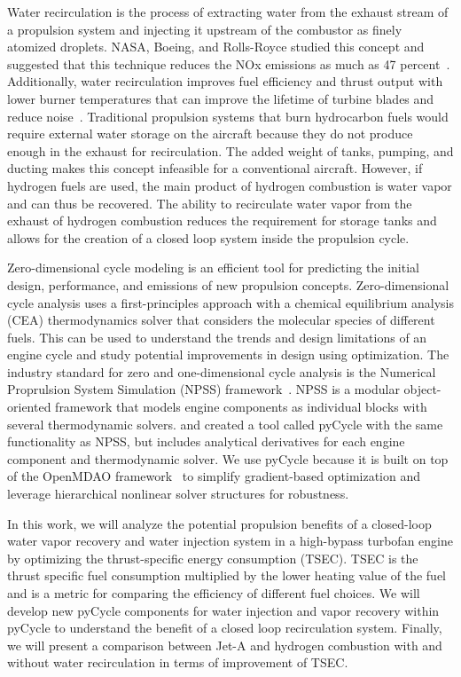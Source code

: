 \documentclass[conf]{new-aiaa}
\begin{document}
Water recirculation is the process of extracting water from the exhaust stream of a propulsion system and injecting it upstream of the combustor as finely atomized droplets.
NASA, Boeing, and Rolls-Royce studied this concept and suggested that this technique reduces the NOx emissions as much as 47 percent~\cite{nasa_inject}.
Additionally, water recirculation improves fuel efficiency and thrust output with lower burner temperatures that can improve the lifetime of turbine blades and reduce noise~\cite{nasa_inject}.
Traditional propulsion systems that burn hydrocarbon fuels would require external water storage on the aircraft because they do not produce enough in the exhaust for recirculation.
The added weight of tanks, pumping, and ducting makes this concept infeasible for a conventional aircraft.
However, if hydrogen fuels are used, the main product of hydrogen combustion is water vapor and can thus be recovered.
The ability to recirculate water vapor from the exhaust of hydrogen combustion reduces the requirement for storage tanks and allows for the creation of a closed loop system inside the propulsion cycle.

Zero-dimensional cycle modeling is an efficient tool for predicting the initial design, performance, and emissions of new propulsion concepts.
Zero-dimensional cycle analysis uses a first-principles approach with a chemical equilibrium analysis (CEA) thermodynamics solver that considers the molecular species of different fuels.
This can be used to understand the trends and design limitations of an engine cycle and study potential improvements in design using optimization.
The industry standard for zero and one-dimensional cycle analysis is the Numerical Proprulsion System Simulation (NPSS) framework~\cite{JonesNPSS}.
NPSS is a modular object-oriented framework that models engine components as individual blocks with several thermodynamic solvers.
\citet{Hendricks2019} and \citet{Gray2017b} created a tool called pyCycle with the same functionality as NPSS, but includes analytical derivatives for each engine component and thermodynamic solver.
We use pyCycle because it is built on top of the OpenMDAO framework~\cite{Gray2019a} to simplify gradient-based optimization and leverage hierarchical nonlinear solver structures for robustness.

In this work, we will analyze the potential propulsion benefits of a closed-loop water vapor recovery and water injection system in a high-bypass turbofan engine by optimizing the thrust-specific energy consumption (TSEC).
TSEC is the thrust specific fuel consumption multiplied by the lower heating value of the fuel and is a metric for comparing the efficiency of different fuel choices.
We will develop new pyCycle components for water injection and vapor recovery within pyCycle to understand the benefit of a closed loop recirculation system.
Finally, we will present a comparison between Jet-A and hydrogen combustion with and without water recirculation in terms of improvement of TSEC.
\end{document}
